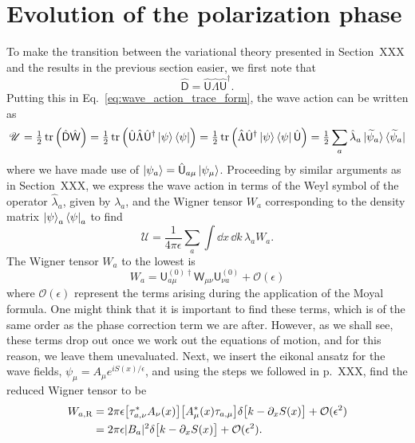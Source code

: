 \section{Evolution of the polarization phase}

To make the transition between the variational theory presented in Section~XXX and the results in the previous section easier, we first note that
%
\begin{equation}
  \hat{\mathsf{D}} = \hat{\mathsf{U}}\hat{\Lambda}\hat{\mathsf{U}}^{\dagger}.
\end{equation}
%
Putting this in Eq.~\eqref{eq:wave_action_trace_form}, the wave action can be written as
%
\begin{equation}
  \mathscr{U} = \tfrac{1}{2}\operatorname{tr}\left(\hat{\mathsf{D}}\hat{\mathsf{W}}\right) = \tfrac{1}{2}\operatorname{tr}\left(\hat{\mathsf{U}}\hat{\Lambda}\hat{\mathsf{U}}^{\dagger}\mathinner{\lvert{\psi}\rangle}\mathinner{\langle{\psi}\rvert}\right) = \tfrac{1}{2}\operatorname{tr}\left(\hat{\Lambda}\hat{\mathsf{U}}^{\dagger}\mathinner{\lvert{\psi}\rangle}\mathinner{\langle{\psi}\rvert}\hat{\mathsf{U}}\right)
  = \tfrac{1}{2}\sum_{a} \hat{\lambda}_{a}\mathinner{\lvert{\widetilde{\psi}_{a}}\rangle}\mathinner{\langle{\widetilde{\psi}_{a}}\rvert}
\end{equation}
%
where we have made use of $\mathinner{\lvert{\psi_{a}}\rangle} = \hat{\mathsf{U}}_{a\mu}\mathinner{\lvert{\psi_{\mu}}\rangle}$.
Proceeding by similar arguments as in Section~XXX, we express the wave action in terms of the Weyl symbol of the operator $\hat{\lambda}_{a}$, given by $\lambda_{a}$,  and the Wigner tensor $W_{a}$ corresponding to the density matrix $\mathinner{\lvert{\psi}\rangle}_{a}\mathinner{\langle{\psi}\rvert}_{a}$ to find
%
\begin{equation}
  \mathscr{U} = \frac{1}{4\pi\epsilon}\sum_{a}\int \dd{x}\,\dd{k}\, \lambda_{a} W_{a}.
\end{equation}
%
The Wigner tensor $W_{a}$ to the lowest is
%
\begin{equation}
  W_{a} = \mathsf{U}^{(0)\dagger}_{a\mu}\mathsf{W}_{\mu\nu}\mathsf{U}^{(0)}_{\nu a} + \mathcal{O}(\epsilon)
\end{equation}
%
where $\mathcal{O}(\epsilon)$ represent the terms arising during the application of the Moyal formula.
One might think that it is important to find these terms, which is of the same order as the phase correction term we are after.
However, as we shall see, these terms drop out once we work out the equations of motion, and for this reason, we leave them unevaluated.
Next, we insert the eikonal ansatz for the wave fields, $\psi_{\mu} = A_{\mu}e^{iS(x)/\epsilon}$, and using the steps we followed in p.~XXX, find the reduced Wigner tensor to be
%
\begin{equation}
  \begin{aligned}
    W_{a,\text{R}} &= 2\pi \epsilon\big[\tau_{a,\nu}^{*} A_{\nu}(x)\big]\big[A^{*}_{\mu}(x)\tau_{a,\mu}\big]\delta\big[k - \partial_{x}S(x)\big] + \mathcal{O}(\epsilon^{2})\\
                   &= 2\pi\epsilon \abs{B_{a}}^{2} \delta\big[k - \partial_{x}S(x)\big] + \mathcal{O}(\epsilon^{2}).
  \end{aligned}
\end{equation}
